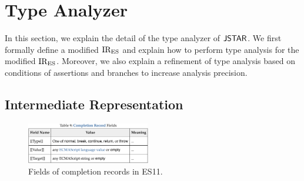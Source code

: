 \section{Type Analyzer}\label{sec:analyzer}

In this section, we explain the detail of the type analyzer of $\textsf{JSTAR}$. We first
formally define a modified ${\text{IR}_\text{ES}}$ and explain how to perform type analysis for
the modified ${\text{IR}_\text{ES}}$.  Moreover, we also explain a refinement of type analysis
based on conditions of assertions and branches to increase analysis precision.

\subsection{Intermediate Representation}\label{sec:ires}

\begin{figure}
  \centering
  \includegraphics[width=0.48\textwidth]{img/record-fields-table}
  \vspace*{-1.5em}
  \caption{Fields of completion records in ES11.}
  \label{fig:record-fields-table}
  \vspace*{-1.5em}
\end{figure}

